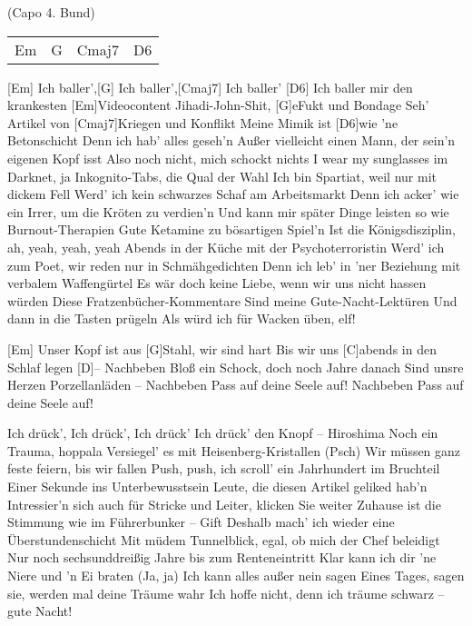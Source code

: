 
{\footnotesize(Capo 4. Bund)}

\begin{guitar}
	{\footnotesize\begin{tabular}{l|l|l|l}
			Em & G & Cmaj7 & D6
	\end{tabular}}

	[Em] Ich baller',[G] Ich baller',[Cmaj7] Ich baller' [D6]{}
	Ich baller mir den krankesten [Em]Videocontent
	Jihadi-John-Shit, [G]eFukt und Bondage
	Seh' Artikel von [Cmaj7]Kriegen und Konflikt
	Meine Mimik ist [D6]wie 'ne Betonschicht
	Denn ich hab' alles geseh'n
	Außer vielleicht einen Mann, der sein'n eigenen Kopf isst
	Also noch nicht, mich schockt nichts
	I wear my sunglasses im Darknet, ja
	Inkognito-Tabs, die Qual der Wahl
	Ich bin Spartiat, weil nur mit dickem Fell
	Werd' ich kein schwarzes Schaf am Arbeitsmarkt
	Denn ich acker' wie ein Irrer, um die Kröten zu verdien'n
	Und kann mir später Dinge leisten so wie Burnout-Therapien
	Gute Ketamine zu bösartigen Spiel'n
	Ist die Königsdisziplin, ah, yeah, yeah, yeah
	Abends in der Küche mit der Psychoterroristin
	Werd' ich zum Poet, wir reden nur in Schmähgedichten
	Denn ich leb' in 'ner Beziehung mit verbalem Waffengürtel
	Es wär doch keine Liebe, wenn wir uns nicht hassen würden
	Diese Fratzenbücher-Kommentare
	Sind meine Gute-Nacht-Lektüren
	Und dann in die Tasten prügeln
	Als würd ich für Wacken üben, elf!
	
	[Em] Unser Kopf ist aus [G]Stahl, wir sind hart
	Bis wir uns [C]abends in den Schlaf legen [D]{–} Nachbeben
	Bloß ein Schock, doch noch Jahre danach
	Sind unsre Herzen Porzellanläden – Nachbeben
	Pass auf deine Seele auf! Nachbeben
	Pass auf deine Seele auf!
	
	Ich drück', Ich drück', Ich drück'
	Ich drück' den Knopf – Hiroshima
	Noch ein Trauma, hoppala
	Versiegel' es mit Heisenberg-Kristallen (Psch)
	Wir müssen ganz feste feiern, bis wir fallen
	Push, push, ich scroll' ein Jahrhundert im Bruchteil
	Einer Sekunde ins Unterbewusstsein
	Leute, die diesen Artikel geliked hab'n
	Intressier'n sich auch für Stricke und Leiter, klicken Sie weiter
	Zuhause ist die Stimmung wie im Führerbunker – Gift
	Deshalb mach' ich wieder eine Überstundenschicht
	Mit müdem Tunnelblick, egal, ob mich der Chef beleidigt
	Nur noch sechsunddreißig Jahre bis zum Renteneintritt
	Klar kann ich dir 'ne Niere und 'n Ei braten (Ja, ja)
	Ich kann alles außer nein sagen
	Eines Tages, sagen sie, werden mal deine Träume wahr
	Ich hoffe nicht, denn ich träume schwarz – gute Nacht!
	

\end{guitar}
